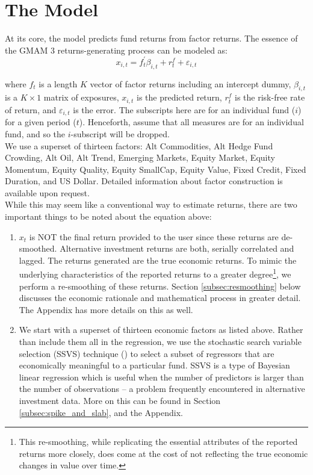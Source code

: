 \documentclass[11pt]{article}
\begin{document}
\section{The Model}
At its core, the model predicts fund returns from factor returns. The essence of the GMAM 3 returns-generating process can be modeled as:
\begin{equation}
	x_{i,t} = f^{\prime}_t \beta_{i,t} + r_t^f + \varepsilon_{i,t}
\end{equation}

where $f_t$ is a length $K$ vector of factor returns including an intercept dummy, $\beta_{i,t}$  is a $K \times 1$ matrix of exposures, $x_{i,t}$ is the predicted return, $r_t^f$ is the risk-free rate of return, and $\varepsilon_{i,t}$ is the error. The subscripts here are for an individual fund ($i$) for a given period ($t$). Henceforth, assume that all measures are for an individual fund, and so the $i$-subscript will be dropped. \\

We use a superset of thirteen factors: Alt Commodities, Alt Hedge Fund Crowding, Alt Oil, Alt Trend, Emerging Markets, Equity Market, Equity Momentum, Equity Quality, Equity SmallCap, Equity Value, Fixed Credit, Fixed Duration, and US Dollar. Detailed information about factor construction is available upon request. \\

While this may seem like a conventional way to estimate returns, there are two important things to be noted about the equation above:
\begin{enumerate}
	\item $x_t$ is NOT the final return provided to the user since these returns are de-smoothed. Alternative investment returns are both, serially correlated and lagged. The returns generated are the true economic returns. To mimic the underlying characteristics of the reported returns to a greater degree\footnote{This re-smoothing, while replicating the essential attributes of the reported returns more closely, does come at the cost of not reflecting the true economic changes in value over time.}, we perform a re-smoothing of these returns. Section \ref{subsec:resmoothing} below discusses the economic rationale and mathematical process in greater detail. The Appendix has more details on this as well.
	\item We start with a superset of thirteen economic factors as listed above. Rather than include them all in the regression, we use the stochastic search variable selection (SSVS) technique (\cite{george_and_mcculloch}) to select a subset of regressors that are economically meaningful to a particular fund. SSVS is a type of Bayesian linear regression which is useful when the number of predictors is larger than the number of observations – a problem frequently encountered in alternative investment data. More on this can be found in Section \ref{subsec:spike_and_slab}, and the Appendix.
\end{enumerate}
\end{document}
